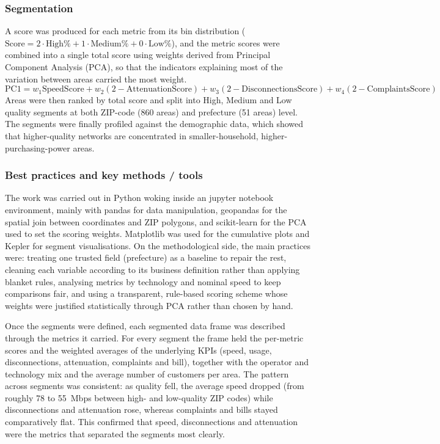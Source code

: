\documentclass[12pt, a4paper, oneside]{report}
\begin{document}
\subsubsection {Segmentation} 
A score was produced for each metric from its bin distribution ($\text{Score} = 2\cdot\text{High\%} + 1\cdot\text{Medium\%} + 0\cdot\text{Low\%}$), and the metric scores were combined into a single total score using weights derived from Principal Component Analysis (PCA), so that the indicators explaining most of the variation between areas carried the most weight. 
\begin{equation}
\mathrm{PC1}=w_1\mathrm{SpeedScore}+w_2(2-\mathrm{AttenuationScore})+w_3(2-\mathrm{DisconnectionsScore})+w_4(2-\mathrm{ComplaintsScore})
\end{equation}
Areas were then ranked by total score and split into High, Medium and Low quality segments at both ZIP-code (860 areas) and prefecture (51 areas) level. The segments were finally profiled against the demographic data, which showed that higher-quality networks are concentrated in smaller-household, higher-purchasing-power areas.

\subsubsection{Best practices and key methods / tools}
The work was carried out in Python woking inside an jupyter notebook environment, mainly with pandas for data manipulation, geopandas for the spatial join between coordinates and ZIP polygons, and scikit-learn for the PCA used to set the scoring weights. Matplotlib was used for the cumulative plots and Kepler for segment visualisations. On the methodological side, the main practices were: treating one trusted field (prefecture) as a baseline to repair the rest, cleaning each variable according to its business definition rather than applying blanket rules, analysing metrics by technology and nominal speed to keep comparisons fair, and using a transparent, rule-based scoring scheme whose weights were justified statistically through PCA rather than chosen by hand.

Once the segments were defined, each segmented data frame was described through the metrics it carried. For every segment the frame held the per-metric scores and the weighted averages of the underlying KPIs (speed, usage, disconnections, attenuation, complaints and bill), together with the operator and technology mix and the average number of customers per area. The pattern across segments was consistent: as quality fell, the average speed dropped (from roughly 78 to 55~Mbps between high- and low-quality ZIP codes) while disconnections and attenuation rose, whereas complaints and bills stayed comparatively flat. This confirmed that speed, disconnections and attenuation were the metrics that separated the segments most clearly.
 
\end{document}
